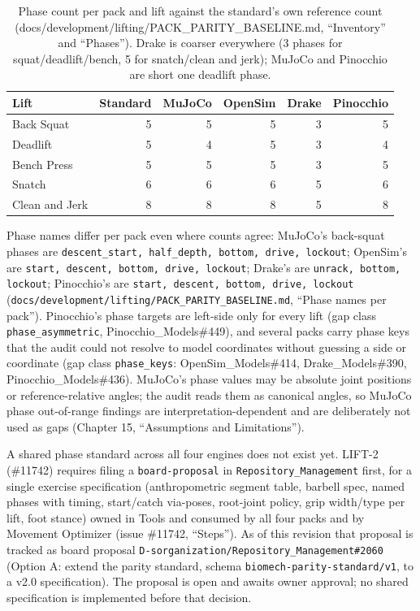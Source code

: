 \documentclass[11pt,a4paper]{article}
\begin{document}
\begin{table}[h]
\centering\small
\begin{tabular}{lrrrrr}
\toprule
Lift & Standard & MuJoCo & OpenSim & Drake & Pinocchio\\
\midrule
Back Squat      & 5 & 5 & 5 & 3 & 5\\
Deadlift        & 5 & 4 & 5 & 3 & 4\\
Bench Press     & 5 & 5 & 5 & 3 & 5\\
Snatch          & 6 & 6 & 6 & 5 & 6\\
Clean and Jerk  & 8 & 8 & 8 & 5 & 8\\
\bottomrule
\end{tabular}
\caption{Phase count per pack and lift against the standard's own reference
count (docs/development/lifting/PACK\_PARITY\_BASELINE.md, ``Inventory'' and
``Phases''). Drake is coarser everywhere (3 phases for squat/deadlift/bench,
5 for snatch/clean and jerk); MuJoCo and Pinocchio are short one deadlift
phase.}
\end{table}

Phase names differ per pack even where counts agree: MuJoCo's back-squat
phases are \texttt{descent\_start, half\_depth, bottom, drive, lockout};
OpenSim's are \texttt{start, descent, bottom, drive, lockout}; Drake's are
\texttt{unrack, bottom, lockout}; Pinocchio's are \texttt{start, descent,
bottom, drive, lockout}
(\texttt{docs/development/lifting/PACK\_PARITY\_BASELINE.md}, ``Phase names
per pack''). Pinocchio's phase targets are left-side only for every lift
(gap class \texttt{phase\_asymmetric}, Pinocchio\_Models\#449), and several
packs carry phase keys that the audit could not resolve to model coordinates
without guessing a side or coordinate (gap class \texttt{phase\_keys}:
OpenSim\_Models\#414, Drake\_Models\#390, Pinocchio\_Models\#436). MuJoCo's
phase values may be absolute joint positions or reference-relative angles;
the audit reads them as canonical angles, so MuJoCo phase out-of-range
findings are interpretation-dependent and are deliberately not used as gaps
(Chapter 15, ``Assumptions and Limitations'').

A shared phase standard across all four engines does not exist yet. LIFT-2
(\#11742) requires filing a \texttt{board-proposal} in
\texttt{Repository\_Management} first, for a single exercise specification
(anthropometric segment table, barbell spec, named phases with timing,
start/catch via-poses, root-joint policy, grip width/type per lift, foot
stance) owned in Tools and consumed by all four packs and by Movement
Optimizer (issue \#11742, ``Steps''). As of this revision that proposal is
tracked as board proposal \texttt{D-sorganization/Repository\_Management\#2060}
(Option A: extend the parity standard, schema
\texttt{biomech-parity-standard/v1}, to a v2.0 specification). The proposal
is open and awaits owner approval; no shared specification is implemented
before that decision.
\end{document}
